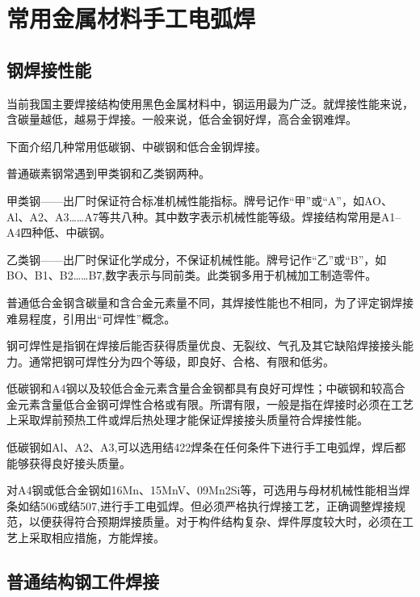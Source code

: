 \documentclass{ctexbook}
\begin{document}
\section{常用金属材料手工电弧焊}
\subsection{钢焊接性能}
当前我国主要焊接结构使用黑色金属材料中，钢运用最为广泛。就焊接性能来说，含碳量越低，越易于焊接。一般来说，低合金钢好焊，高合金钢难焊。

下面介绍几种常用低碳钢、中碳钢和低合金钢焊接。

普通碳素钢常遇到甲类钢和乙类钢两种。

甲类钢——出厂时保证符合标准机械性能指标。牌号记作“甲”或“A”，如AO、Al、A2、A3……A7等共八种。其中数字表示机械性能等级。焊接结构常用是A1--A4四种低、中碳钢。

乙类钢——出厂时保证化学成分，不保证机械性能。牌号记作“乙”或“B”，如BO、B1、B2……B7,数字表示与同前类。此类钢多用于机械加工制造零件。

普通低合金钢含碳量和含合金元素量不同，其焊接性能也不相同，为了评定钢焊接难易程度，引用出“可焊性”概念。

钢可焊性是指钢在焊接后能否获得质量优良、无裂纹、气孔及其它缺陷焊接接头能力。通常把钢可焊性分为四个等级，即良好、合格、有限和低劣。

低碳钢和A4钢以及较低合金元素含量合金钢都具有良好可焊性；中碳钢和较高合金元素含量低合金钢可焊性合格或有限。所谓有限，一般是指在焊接时必须在工艺上采取焊前预热工件或焊后热处理才能保证焊接接头质量符合焊接性能。

低碳钢如Al、A2、A3,可以选用结422焊条在任何条件下进行手工电弧焊，焊后都能够获得良好接头质量。

对A4钢或低合金钢如16Mn、15MnV、09Mn2Si等，可选用与母材机械性能相当焊条如结506或结507,进行手工电弧焊。但必须严格执行焊接工艺，正确调整焊接规范，以便获得符合预期焊接质量。对于构件结构复杂、焊件厚度较大时，必须在工艺上采取相应措施，方能焊接。
\subsection{普通结构钢工件焊接}
\end{document}
